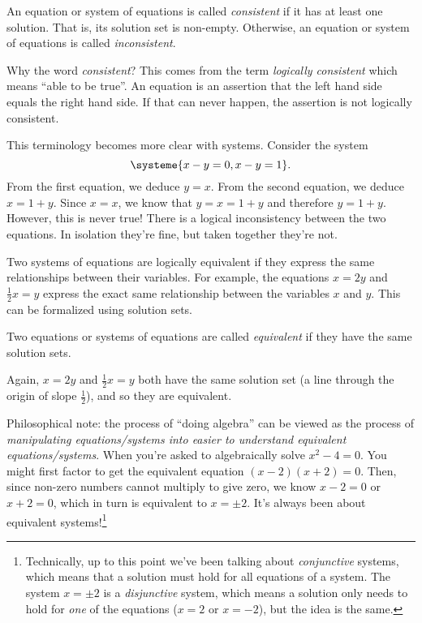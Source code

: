 	\begin{definition}
		An equation or system of equations is called \emph{consistent} if it has at least one solution. That
		is, its solution set is non-empty. Otherwise, an equation or system of equations is called \emph{inconsistent}.
	\end{definition}

	Why the word \emph{consistent}? This comes from the term \emph{logically consistent} which means ``able to be true''.
	An equation is an assertion that the left hand side equals the right hand side. If that can never happen, the assertion
	is not logically consistent.

	This terminology becomes more clear with systems. Consider the system
	\[
		\systeme{x-y=0,x-y=1}.
	\]
	From the first equation, we deduce $y=x$. From the second equation, we deduce $x=1+y$. Since $x=x$, we know that
	$y=x=1+y$ and therefore
	$y=1+y$. However, this is never true! There is a logical inconsistency between the two equations. In isolation they're
	fine, but taken together they're not.

	Two systems of equations are logically equivalent if they express the same relationships
	between their variables. For example, the equations $x=2y$ and $\tfrac{1}{2}x=y$ express the exact same
	relationship between the variables $x$ and $y$. This can be formalized using solution sets.

	\begin{definition}
		Two equations or systems of equations are called \emph{equivalent} if they have the same solution sets.
	\end{definition}

	Again, $x=2y$ and $\tfrac{1}{2}x=y$ both have the same solution set (a line through the origin of slope $\tfrac{1}{2}$),
	and so they are equivalent.

	Philosophical note: the process of ``doing algebra'' can be viewed as
	the process of \emph{manipulating equations/systems into easier to understand equivalent 
	equations/systems}. When you're asked to algebraically solve $x^2-4=0$. You might first factor to get the 
	equivalent equation $(x-2)(x+2)=0$. Then, since non-zero numbers cannot multiply to give zero, we know
	$x-2=0$ or $x+2=0$, which in turn is equivalent to $x=\pm2$. It's always been about equivalent systems!\footnote{
	Technically, up to this point we've been talking about \emph{conjunctive} systems, which means that a solution
	must hold for all equations of a system. The system $x=\pm 2$ is a \emph{disjunctive} system, which means a solution
	only needs to hold for \emph{one} of the equations ($x=2$ or $x=-2$), but the idea is the same.}

